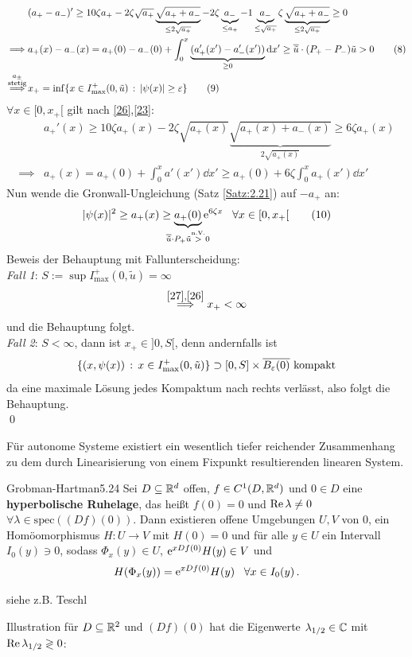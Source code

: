 \documentclass[a4paper]{article}
\begin{document}
\begin{Beweis}
\begin{align*}
&(a_+-a_-)'\ge 10\zeta a_+-2\zeta\sqrt{a_+}\underbrace{\sqrt{a_++a_-}}_{\le 2\sqrt{a_+}}-2\zeta\underbrace{a_-}_{\le a_+}-1\underbrace{a_-}_{\le\sqrt{a_+}}\zeta \underbrace{\sqrt{a_++a_-}}_{\le 2\sqrt{a_+}}\ge 0\\
\implies& 
a_+(x)-a_-(x)=a_+(0)-a_-(0)+\int_0^x\underbrace{(a'_+(x')-a'_-(x'))}_{\ge0}\mathop{}\!\mathrm{d} x'
\ge \overline{\tilde{u}}\cdot (P_+-P_-)\tilde{u}>0
\tag{$8$}\label{25}\\
\overset{\substack{a_{\pm}\\\text{stetig}}}{\implies}& x_+=\inf\{x\in I_{\max}^+(0,\tilde{u})\,:\,|\psi(x)|\ge \operatorname{\varepsilon}\}\tag{$9$}\label{26}
\end{align*}
$\forall x\in [0,x_+[$ gilt nach \eqref{26},\eqref{23}:
\begin{align*}
&a_+'(x)\ge 10 \zeta a_+(x)-2\zeta\sqrt{a_+(x)}\underbrace{\sqrt{a_+(x)+a_-(x)}}_{2\sqrt{a_+(x)}}\ge 6\zeta a_+(x)\\
\implies& a_+(x)=a_+(0)+\int_0^xa'(x')\dd x'\ge a_+(0)+6\zeta\int_0^xa_+(x')\dd x'
\end{align*}
Nun wende die Gronwall-Ungleichung (Satz \ref{Satz:2.21}) auf $-a_+$ an:
\[|\psi(x)|^2\ge a_+(x)\ge\underbrace{a_+(0)}_{
\mathclap{\overline{\tilde{u}}\cdot P_+\tilde{u}\overset{\text{n.V.}}{>}0}}\e^{6\zeta x}\;\;\;\forall x\in[0,x_+[\tag{$10$}\label{27}\]
Beweis der Behauptung mit Fallunterscheidung:\\
\textit{Fall 1}: $S:=\sup I_{\max}^+(0,\tilde{u})=\infty$
\[\overset{\eqref{27},\eqref{26}}{\implies} x_+<\infty\]
und die Behauptung folgt.\\
\textit{Fall 2}: $S<\infty$, dann ist $x_+\in]0,S[$, denn andernfalls ist
\[\{(x,\psi(x))\,:\,x\in I_{\max}^+(0,\tilde{u})\}\supset [0,S]\times\overline{B_{\operatorname{\varepsilon}}(0)}\text{ kompakt}\]
\lightning{} da eine maximale Lösung jedes Kompaktum nach rechts verlässt, also folgt die Behauptung.\\\qed
\end{Beweis}

Für autonome Systeme existiert ein wesentlich tiefer reichender Zusammenhang zu dem durch Linearisierung von einem Fixpunkt resultierenden linearen System.

\begin{Satz}{Grobman-Hartman}{5.24}
Sei $D\subseteq \mathbb R^d$ offen, $f\in C^1(D,\mathbb R^d)$ und $0\in D$ eine \textbf{hyperbolische Ruhelage}, das heißt $f(0)=0$ und $\operatorname{\textrm{Re}}\lambda\ne 0$ $\forall \lambda\in\mathrm{spec}((Df)(0))$. Dann existieren offene Umgebungen $U,V$ von 0, ein Homöomorphismus $H\colon U\to V$ mit $H(0)=0$ und für alle $y\in U$ ein Intervall $I_0(y)\ni 0$, sodass $\Phi_x(y)\in U$, $\mathrm{e}^{xDf(0)}H(y)\in V$ und
\[H(\Phi_x(y))=\mathrm{e}^{xDf(0)}H(y)\;\;\;\forall x\in I_0(y)\,.\]
\end{Satz}
\begin{Beweis}
siehe z.B. Teschl
\end{Beweis}
Illustration für $D\subseteq \mathbb R^2$ und $(Df)(0)$ hat die Eigenwerte $\lambda_{1/2}\in \operatorname{\mathbb C}$ mit $\operatorname{\textrm{Re}} \lambda_{1/2}\gtrless 0$:
\end{document}
